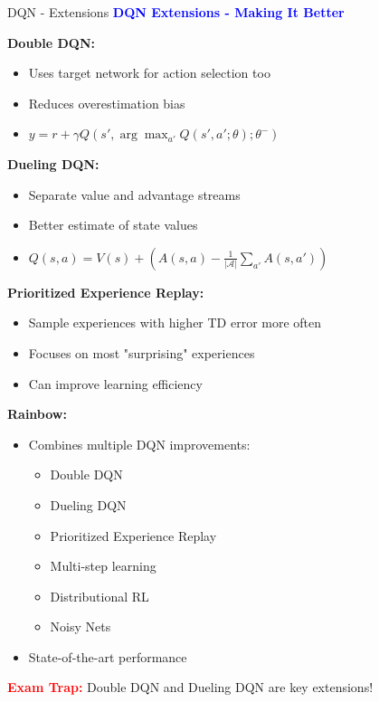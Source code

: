 \documentclass[8pt]{beamer}
\begin{document}
\begin{frame}{DQN - Extensions}
\fontsize{6.5}{7.5}\selectfont
\textcolor{blue}{\textbf{DQN Extensions - Making It Better}}

\textbf{Double DQN:}
\begin{itemize}
\item Uses target network for action selection too
\item Reduces overestimation bias
\item $y = r + \gamma Q(s', \arg\max_{a'} Q(s',a';\theta); \theta^-)$
\end{itemize}

\textbf{Dueling DQN:}
\begin{itemize}
\item Separate value and advantage streams
\item Better estimate of state values
\item $Q(s,a) = V(s) + (A(s,a) - \frac{1}{|\mathcal{A}|}\sum_{a'} A(s,a'))$
\end{itemize}

\textbf{Prioritized Experience Replay:}
\begin{itemize}
\item Sample experiences with higher TD error more often
\item Focuses on most "surprising" experiences
\item Can improve learning efficiency
\end{itemize}

\textbf{Rainbow:}
\begin{itemize}
\item Combines multiple DQN improvements:
\begin{itemize}
\item Double DQN
\item Dueling DQN
\item Prioritized Experience Replay
\item Multi-step learning
\item Distributional RL
\item Noisy Nets
\end{itemize}
\item State-of-the-art performance
\end{itemize}

\textcolor{red}{\textbf{Exam Trap:}} Double DQN and Dueling DQN are key extensions!
\end{frame}
\end{document}
